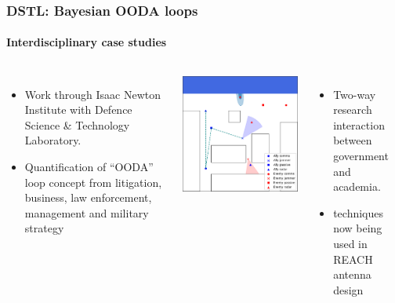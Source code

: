 \documentclass[aspectratio=169]{beamer}
\begin{document}
\begin{frame}
    \frametitle{DSTL: Bayesian OODA loops}
    \framesubtitle{Interdisciplinary case studies}
    \begin{columns}
        \begin{itemize}
            \item Work through Isaac Newton Institute with Defence Science \& Technology Laboratory.
            \item Quantification of ``OODA'' loop concept from litigation, business, law enforcement, management and military strategy
        \end{itemize}


        \begin{columns}
            \includegraphics[width=\textwidth]{figures/midas.png}%
            \begin{itemize}
                \item Two-way research interaction between government and academia.
                \item techniques now being used in REACH antenna design~
            \end{itemize}
        \end{columns}



\end{columns}
\end{frame}
\end{document}
